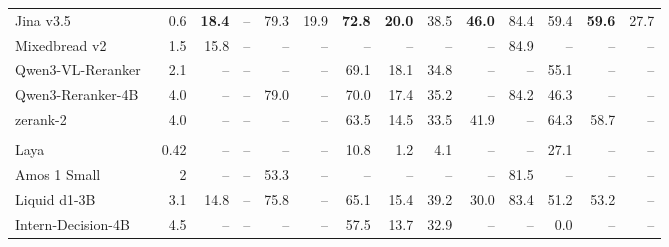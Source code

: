 \begin{table}[t]
\begin{tabular}{@{}l r rrrr rrrr rrrr@{}}
\quad Jina v3.5~\cite{nasika2026jina} & 0.6 & \textbf{18.4} & \textcolor{black!30}{--} & 79.3 & 19.9 & \textbf{72.8} & \textbf{20.0} & 38.5 & \textbf{46.0} & 84.4 & 59.4 & \textbf{59.6} & 27.7\\
\quad Mixedbread v2 & 1.5 & 15.8 & \textcolor{black!30}{--} & \textcolor{black!30}{--} & \textcolor{black!30}{--} & \textcolor{black!30}{--} & \textcolor{black!30}{--} & \textcolor{black!30}{--} & \textcolor{black!30}{--} & 84.9 & \textcolor{black!30}{--} & \textcolor{black!30}{--} & \textcolor{black!30}{--}\\
\quad Qwen3-VL-Reranker~\cite{li2026qwen3vlemb} & 2.1 & \textcolor{black!30}{--} & \textcolor{black!30}{--} & \textcolor{black!30}{--} & \textcolor{black!30}{--} & 69.1 & 18.1 & 34.8 & \textcolor{black!30}{--} & \textcolor{black!30}{--} & 55.1 & \textcolor{black!30}{--} & \textcolor{black!30}{--}\\
\quad Qwen3-Reranker-4B~\cite{zhang2025qwen3emb} & 4.0 & \textcolor{black!30}{--} & \textcolor{black!30}{--} & 79.0 & \textcolor{black!30}{--} & 70.0 & 17.4 & 35.2 & \textcolor{black!30}{--} & 84.2 & 46.3 & \textcolor{black!30}{--} & \textcolor{black!30}{--}\\
\quad zerank-2~\cite{pipitone2025zelo} & 4.0 & \textcolor{black!30}{--} & \textcolor{black!30}{--} & \textcolor{black!30}{--} & \textcolor{black!30}{--} & 63.5 & 14.5 & 33.5 & 41.9 & \textcolor{black!30}{--} & 64.3 & 58.7 & \textcolor{black!30}{--}\\
\addlinespace[2pt]\multicolumn{14}{@{}l}{\textit{System-1-style decision models (12)}}\\[1pt]
\quad Laya & 0.42 & \textcolor{black!30}{--} & \textcolor{black!30}{--} & \textcolor{black!30}{--} & \textcolor{black!30}{--} & 10.8 & 1.2 & 4.1 & \textcolor{black!30}{--} & \textcolor{black!30}{--} & 27.1 & \textcolor{black!30}{--} & \textcolor{black!30}{--}\\
\quad Amos 1 Small & 2 & \textcolor{black!30}{--} & \textcolor{black!30}{--} & 53.3\rlap{$^\dagger$} & \textcolor{black!30}{--} & \textcolor{black!30}{--} & \textcolor{black!30}{--} & \textcolor{black!30}{--} & \textcolor{black!30}{--} & 81.5 & \textcolor{black!30}{--} & \textcolor{black!30}{--} & \textcolor{black!30}{--}\\
\quad Liquid d1-3B & 3.1 & 14.8 & \textcolor{black!30}{--} & 75.8 & \textcolor{black!30}{--} & 65.1 & 15.4 & 39.2 & 30.0 & 83.4 & 51.2 & 53.2 & \textcolor{black!30}{--}\\
\quad Intern-Decision-4B & 4.5 & \textcolor{black!30}{--} & \textcolor{black!30}{--} & \textcolor{black!30}{--} & \textcolor{black!30}{--} & 57.5 & 13.7 & 32.9 & \textcolor{black!30}{--} & \textcolor{black!30}{--} & 0.0\rlap{$^\dagger$} & \textcolor{black!30}{--} & \textcolor{black!30}{--}\\

\end{tabular}
\end{table}
